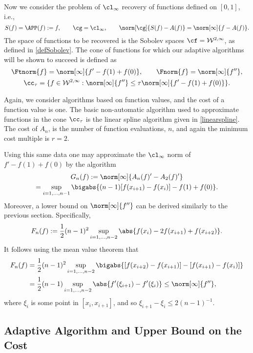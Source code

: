 Now we consider the problem of $\cl_{\infty}$ recovery of functions defined on $[0,1]$, i.e.,
\[
S(f)=\APP(f):=f, \qquad \cg=\cl_{\infty}, \qquad \norm[\cg]{S(f)-A(f)}=\norm[\infty]{f-A(f)}.
\]
The space of functions to be recovered is the Sobolev spaces $\cf = \mathcal{W}^{2,\infty}$, as defined in \eqref{defSobolev}.  The cone of functions for which our adaptive algorithms will be shown to succeed is defined as
\begin{subequations} \label{coneappxdef}
\begin{gather}
\Ftnorm{f}=\norm[\infty]{f'-f(1)+f(0)}, \qquad \Fnorm{f}=\norm[\infty]{f''}, \\
\cc_{\tau}=\{f \in  \mathcal{W}^{2,\infty} : \norm[\infty]{f''}\leq \tau\norm[\infty]{f'-f(1)+f(0)}\}.
\end{gather}
\end{subequations}

Again, we consider algorithms based on function values, and the cost of a function value is one.   The basic non-automatic algorithm used to approximate functions in the cone $\cc_{\tau}$ is the linear spline algorithm given in \eqref{linearspline}.  
The cost of $A_n$, is the number of function evaluations, $n$, and again the minimum cost multiple is $r=2$.

Using this same data one may approximate the $\cl_\infty$ norm of $f'-f(1)+f(0)$ by the algorithm
\begin{multline}\label{estfirstderiv}
G_n(f) := \norm[\infty]{A_n(f)' - A_2(f)'} \\
= \sup_{i=1, \ldots, n-1} \bigabs{(n-1) [f(x_{i+1})-f(x_i)]-f(1)+f(0)}.
\end{multline}
Moreover, a lower bound on $\norm[\infty]{f''}$ can be derived similarly to the previous section.  Specifically,
\begin{equation} \label{Fnormappxalg}
F_n(f) := \frac 1 2 (n-1)^2\sup_{i=1, ..., n-2} \abs{f(x_i) - 2 f(x_{i+1})+f(x_{i+2})}.
\end{equation}
It follows using the mean value theorem that 
\begin{align*}
F_n(f) &= \frac 1 2 (n-1)^2\sup_{i=1, ..., n-2} \bigabs{[f(x_{i+2}) - f(x_{i+1})] - [f(x_{i+1}) - f(x_{i})]} \\
&= \frac 1 2 (n-1)\sup_{i=1, ..., n-2} \abs{f'(\xi_{i+1}) - f'(\xi_{i})} \le \norm[\infty]{f''},
\end{align*}
where $\xi_i$ is some point in $[x_i,x_{i+1}]$, and so $\xi_{i+1} - \xi_i \le 2(n-1)^{-1}$.

\subsection{Adaptive Algorithm and Upper Bound on the Cost}

